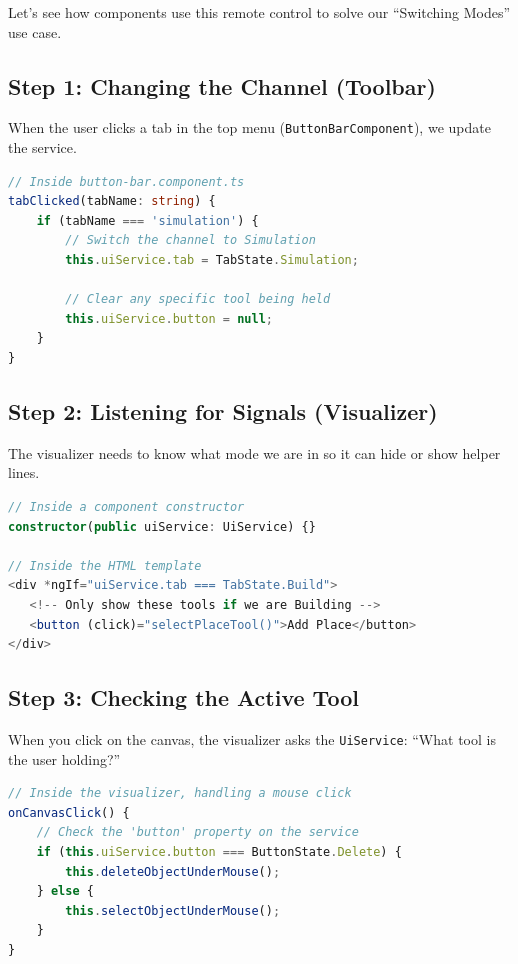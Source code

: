 \documentclass[a4paper,11pt,oneside]{report}
\begin{document}
Let's see how components use this remote control to solve our ``Switching Modes'' use case.

\subsection{Step 1: Changing the Channel (Toolbar)}

When the user clicks a tab in the top menu (\texttt{ButtonBarComponent}), we update the service.

\begin{lstlisting}[language=TypeScript]
// Inside button-bar.component.ts
tabClicked(tabName: string) {
    if (tabName === 'simulation') {
        // Switch the channel to Simulation
        this.uiService.tab = TabState.Simulation;
        
        // Clear any specific tool being held
        this.uiService.button = null;
    }
}
\end{lstlisting}

\subsection{Step 2: Listening for Signals (Visualizer)}

The visualizer needs to know what mode we are in so it can hide or show helper lines.

\begin{lstlisting}[language=TypeScript]
// Inside a component constructor
constructor(public uiService: UiService) {}

// Inside the HTML template
<div *ngIf="uiService.tab === TabState.Build">
   <!-- Only show these tools if we are Building -->
   <button (click)="selectPlaceTool()">Add Place</button>
</div>
\end{lstlisting}

\subsection{Step 3: Checking the Active Tool}

When you click on the canvas, the visualizer asks the \texttt{UiService}: ``What tool is the user holding?''

\begin{lstlisting}[language=TypeScript]
// Inside the visualizer, handling a mouse click
onCanvasClick() {
    // Check the 'button' property on the service
    if (this.uiService.button === ButtonState.Delete) {
        this.deleteObjectUnderMouse();
    } else {
        this.selectObjectUnderMouse();
    }
}
\end{lstlisting}
\end{document}
